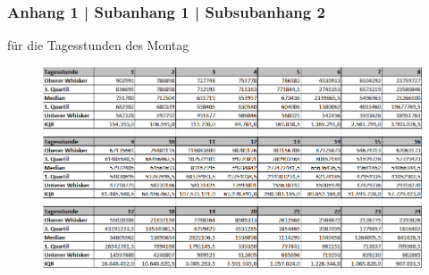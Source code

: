 \documentclass[deutsch]{lib/llncs/llncs}
\begin{document}
\subsubsection{Anhang 1 | Subanhang 1 | Subsubanhang 2} für die Tagesstunden des Montag
\begin{figure}[!htb]
	\centering
	\includegraphics[scale=0.65]{img/BoxplotDatenPic1.png}
\end{figure}
\end{document}
